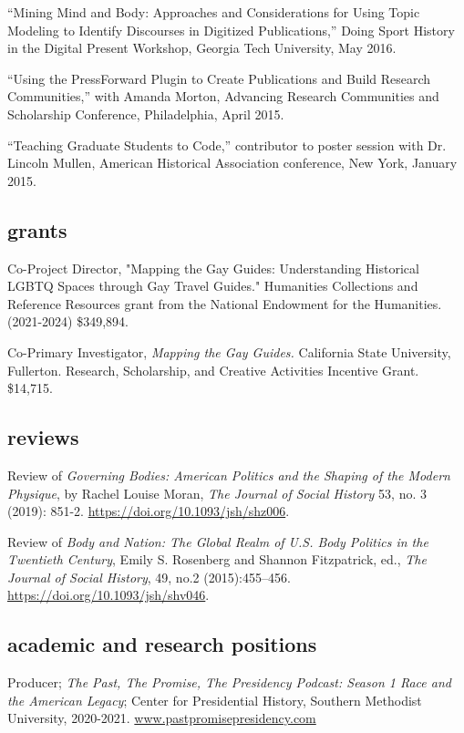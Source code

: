 \documentclass[11pt]{article}
\begin{document}
``Mining Mind and Body: Approaches and Considerations for Using Topic Modeling to Identify Discourses in Digitized Publications,'' Doing Sport History in the Digital Present Workshop, Georgia Tech University, May 2016.

``Using the PressForward Plugin to Create Publications and Build Research Communities,'' with Amanda Morton, Advancing Research Communities and Scholarship Conference, Philadelphia, April 2015.

``Teaching Graduate Students to Code,'' contributor to poster session with Dr. Lincoln Mullen, American Historical Association conference, New York, January 2015.

\subsection{grants}
Co-Project Director, "Mapping the Gay Guides: Understanding Historical LGBTQ Spaces through Gay Travel Guides." Humanities Collections and Reference Resources grant from the National Endowment for the Humanities. (2021-2024) \$349,894.

Co-Primary Investigator, \emph{Mapping the Gay Guides.} California State University, Fullerton. Research, Scholarship, and Creative Activities Incentive Grant. \$14,715.

\subsection{reviews}\label{reviews}

Review of \emph{Governing Bodies: American Politics and the Shaping of the Modern Physique}, by Rachel Louise Moran, \emph{The Journal of Social History} 53, no. 3 (2019): 851-2. \url{https://doi.org/10.1093/jsh/shz006}.

Review of \emph{Body and Nation: The Global Realm of U.S. Body Politics in the Twentieth Century}, Emily S. Rosenberg and Shannon Fitzpatrick, ed., \emph{The Journal of Social History}, 49, no.2 (2015):455–456. \url{https://doi.org/10.1093/jsh/shv046}.

\subsection{academic and research positions}
Producer; \emph{The Past, The Promise, The Presidency Podcast: Season 1 Race and the American Legacy}; Center for Presidential History, Southern Methodist University, 2020-2021. \url{www.pastpromisepresidency.com}
\end{document}
